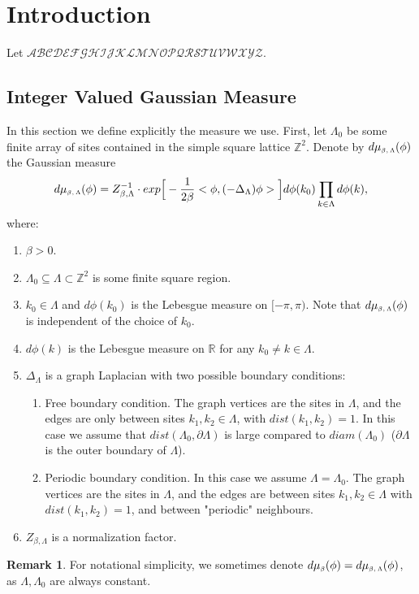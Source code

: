 \documentclass[11pt,reqno]{article}
\theoremstyle{definition}
\newtheorem*{remark}{Remark}
\numberwithin{equation}{section}
\begin{document}
\section{Introduction}\label{sec:introduction}
\newcommand*{\mida}{d\mu_{\text{\tiny$\beta$}}(\phi)}
\newcommand*{\midaLambda}{d\mu_{\text{\tiny$\beta, \Lambda$}}(\phi)}
\newcommand*{\midar}{d\mu_\beta(\phi)}
Let $\mathscr{ABCDEFGHIJKLMNOPQRSTUVWXYZ}$.

\subsection{Integer Valued Gaussian Measure}
In this section we define explicitly the measure we use.
First, let $\Lambda_0$ be some finite array of sites contained in the simple square lattice $\mathbb{Z}^2$. Denote by $\midaLambda$ the Gaussian measure
\begin{equation} \label{label:mida}
\midaLambda = Z_{\beta, \Lambda}^{-1} \cdot exp\Big[-\frac{1}{2\beta}<\phi, (-\Delta_\Lambda)\phi>\Big]d\phi(k_0)\prod_{k \in \Lambda}d\phi(k),
\end{equation}
where:
\begin{enumerate}
\item $\beta > 0$.
\item $\Lambda_0 \subseteq \Lambda \subset \mathbb{Z}^2$ is some finite square region.
\item $k_0 \in \Lambda$ and $d\phi(k_0)$ is the Lebesgue measure on $[-\pi,\pi)$. Note that $\midaLambda$ is independent of the choice of $k_0$.
\item $d\phi(k)$ is the Lebesgue measure on $\mathbb{R}$ for any $k_0 \neq k \in \Lambda$.
\item $\Delta_\Lambda$ is a graph Laplacian with two possible boundary conditions:
\begin{enumerate}
\item Free boundary condition. The graph vertices are the sites in $\Lambda$, and the edges are only between sites $k_1, k_2 \in \Lambda$, with $dist(k_1, k_2) = 1$. In this case we assume that $dist(\Lambda_0, \partial\Lambda)$ is large compared to $diam(\Lambda_0)$ ($\partial\Lambda$ is the outer boundary of $\Lambda$). 
\item Periodic boundary condition. In this case we assume $\Lambda = \Lambda_0$. The graph vertices are the sites in $\Lambda$, and the edges are between sites $k_1, k_2 \in \Lambda$ with $dist(k_1, k_2) = 1$, and between "periodic" neighbours.
\end{enumerate}
\item $Z_{\beta, \Lambda}$ is a normalization factor.
\end{enumerate}
\begin{remark}
For notational simplicity, we sometimes denote $\mida = \midaLambda$, as $\Lambda, \Lambda_0$ are always constant.
\end{remark}
\end{document}
